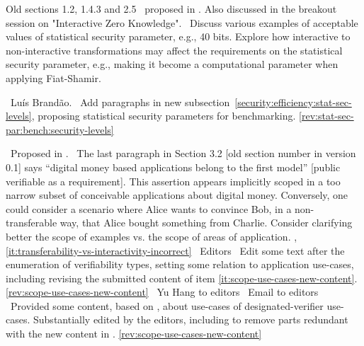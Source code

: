 Old sections 1.2, 1.4.3 and 2.5
\newcol \ccontext\ proposed in . Also discussed in the breakout session on "Interactive Zero Knowledge".
				\propContrib\ Discuss various examples of acceptable values of statistical security parameter, e.g., 40 bits. Explore how interactive to non-interactive transformations may affect the requirements on the statistical security parameter, e.g., making it become a computational parameter when applying Fiat-Shamir.
				
\newcol {}
\newcol \contributors\ Luís Brandão.
				\Chan\ Add paragraphs in new subsection~\ref{security:efficiency:stat-sec-levels}, proposing statistical security parameters for benchmarking.
\newcol \ref{rev:stat-sec-par:bench:security-levels}
\rowendL
\myendIssue



\newcol \ccontext\ Proposed in .
				\propContrib\ The last paragraph in Section 3.2 [old section number in version 0.1] says ``digital money based applications belong to the first model'' [public verifiable as a requirement]. This assertion appears implicitly scoped in a too narrow subset of conceivable applications about digital money. Conversely, one could consider a scenario where Alice wants to convince Bob, in a non-transferable way, that Alice bought something from Charlie. Consider clarifying better the scope of examples vs. the scope of areas of application.
\newcol {}, \ref{it:transferability-vs-interactivity-incorrect}
\newcol \contributors\ Editors
				\Chan\ Edit some text after the enumeration of verifiability types, 
				setting some relation to application use-cases, including revising the 
				submitted content of item \ref{it:scope-use-cases-new-content}.
\newcol \ref{rev:scope-use-cases-new-content}
\rowendL
\newcol 
\newcol {}
\newcol \contributors\ Yu Hang to editors
				\submit\ Email to editors
				\Chan\ Provided some content, based on \cite{1996:eurocrypt:designated-verifier-proofs}, 
				about use-cases of designated-verifier use-cases. 
					Substantially edited by the editors, including to remove parts redundant with the new 
				content in .
\newcol \ref{rev:scope-use-cases-new-content}
\rowendL
\myendIssue



